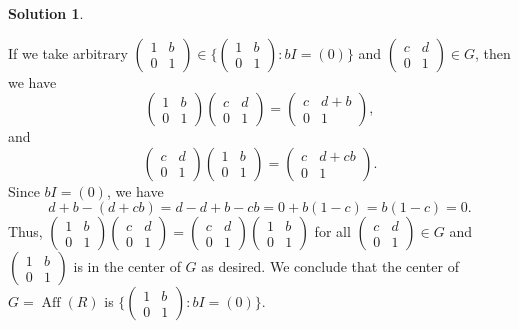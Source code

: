\documentclass[10pt]{article}
\newcommand{\Aff}{\operatorname{Aff}}
\theoremstyle{Theorem}
\theoremstyle{definition}
\newtheorem{sol}{Solution}
\theoremstyle{remark}
\theoremstyle{custom}
\begin{document}
\begin{sol}
\begin{description}
If we take arbitrary $(\begin{smallmatrix}1&b\\0&1\end{smallmatrix}) \in \{(\begin{smallmatrix}1&b\\0&1\end{smallmatrix}) : bI = (0)\}$ and $(\begin{smallmatrix}c&d\\0&1\end{smallmatrix})\in G$, then we have
\[(\begin{smallmatrix}1&b\\0&1\end{smallmatrix})(\begin{smallmatrix}c&d\\0&1\end{smallmatrix})=(\begin{smallmatrix}c&d+b\\0&1\end{smallmatrix}), \]
and 
\[(\begin{smallmatrix}c&d\\0&1\end{smallmatrix})(\begin{smallmatrix}1&b\\0&1\end{smallmatrix})=(\begin{smallmatrix}c&d+cb\\0&1\end{smallmatrix}). \]
Since $bI=(0)$, we have 
\[d+b-(d+cb)=d-d+b-cb=0+b(1-c)=b(1-c)=0.\]
Thus, $(\begin{smallmatrix}1&b\\0&1\end{smallmatrix})(\begin{smallmatrix}c&d\\0&1\end{smallmatrix})=(\begin{smallmatrix}c&d\\0&1\end{smallmatrix})(\begin{smallmatrix}1&b\\0&1\end{smallmatrix})$ for all $(\begin{smallmatrix}c&d\\0&1\end{smallmatrix})\in G$ and $(\begin{smallmatrix}1&b\\0&1\end{smallmatrix})$ is in the center of $G$ as desired. We conclude that the center of $G=\Aff(R)$ is $\{(\begin{smallmatrix}1&b\\0&1\end{smallmatrix}) : bI = (0)\}$.
\end{description}
\end{sol}
\end{document}

